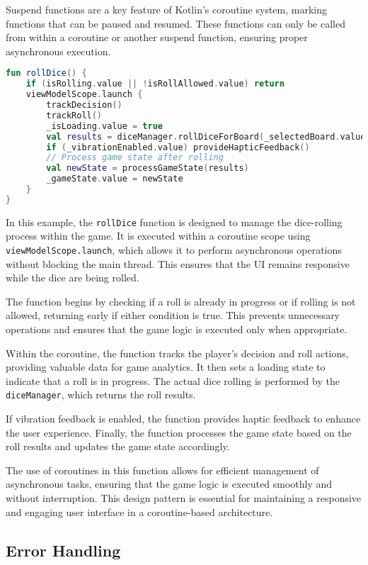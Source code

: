 Suspend functions are a key feature of Kotlin's coroutine system, marking functions that can be paused and resumed. These functions can only be called from within a coroutine or another suspend function, ensuring proper asynchronous execution.
\begin{lstlisting}[language=Kotlin, caption={Suspend Function Example}, label=lst:suspend_function]
fun rollDice() {
    if (isRolling.value || !isRollAllowed.value) return
    viewModelScope.launch {
        trackDecision()
        trackRoll()
        _isLoading.value = true
        val results = diceManager.rollDiceForBoard(_selectedBoard.value)
        if (_vibrationEnabled.value) provideHapticFeedback()
        // Process game state after rolling
        val newState = processGameState(results)
        _gameState.value = newState
    }
}
\end{lstlisting}

In this example, the \texttt{rollDice} function is designed to manage the dice-rolling process within the game. It is executed within a coroutine scope using \texttt{viewModelScope.launch}, which allows it to perform asynchronous operations without blocking the main thread. This ensures that the UI remains responsive while the dice are being rolled.

The function begins by checking if a roll is already in progress or if rolling is not allowed, returning early if either condition is true. This prevents unnecessary operations and ensures that the game logic is executed only when appropriate.

Within the coroutine, the function tracks the player's decision and roll actions, providing valuable data for game analytics. It then sets a loading state to indicate that a roll is in progress. The actual dice rolling is performed by the \texttt{diceManager}, which returns the roll results.

If vibration feedback is enabled, the function provides haptic feedback to enhance the user experience. Finally, the function processes the game state based on the roll results and updates the game state accordingly.

The use of coroutines in this function allows for efficient management of asynchronous tasks, ensuring that the game logic is executed smoothly and without interruption. This design pattern is essential for maintaining a responsive and engaging user interface in a coroutine-based architecture.

\subsection{Error Handling}

